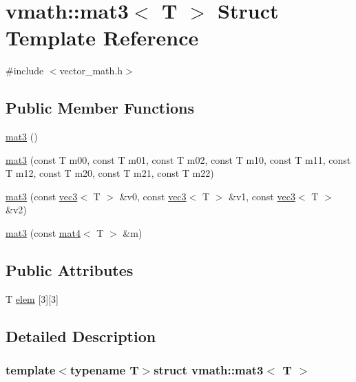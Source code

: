 \hypertarget{structvmath_1_1mat3}{\section{vmath\-:\-:mat3$<$ T $>$ Struct Template Reference}
\label{structvmath_1_1mat3}
}


{\ttfamily \#include $<$vector\-\_\-math.\-h$>$}

\subsection*{Public Member Functions}
\begin{DoxyCompactItemize}
\item 
\hyperlink{structvmath_1_1mat3_a7fdc3c44110b3422bead54caa00ce079}{mat3} ()
\item 
\hyperlink{structvmath_1_1mat3_a87a340245fc6063d86e57b9e1c8c3606}{mat3} (const T m00, const T m01, const T m02, const T m10, const T m11, const T m12, const T m20, const T m21, const T m22)
\item 
\hyperlink{structvmath_1_1mat3_a7bd7f8dfff7fc7c09b4fd07c69405eb0}{mat3} (const \hyperlink{structvmath_1_1vec3}{vec3}$<$ T $>$ \&v0, const \hyperlink{structvmath_1_1vec3}{vec3}$<$ T $>$ \&v1, const \hyperlink{structvmath_1_1vec3}{vec3}$<$ T $>$ \&v2)
\item 
\hyperlink{structvmath_1_1mat3_aa82a14d1a11a27b350e6cab91dbe8a00}{mat3} (const \hyperlink{structvmath_1_1mat4}{mat4}$<$ T $>$ \&m)
\end{DoxyCompactItemize}
\subsection*{Public Attributes}
\begin{DoxyCompactItemize}
\item 
T \hyperlink{structvmath_1_1mat3_a360d347ae57764a92b8818d485b16feb}{elem} \mbox{[}3\mbox{]}\mbox{[}3\mbox{]}
\end{DoxyCompactItemize}


\subsection{Detailed Description}
\subsubsection*{template$<$typename T$>$struct vmath\-::mat3$<$ T $>$}



